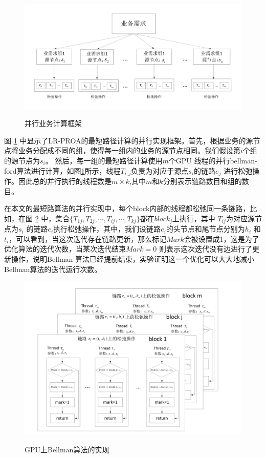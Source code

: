 \begin{figure}
\setlength{\belowcaptionskip}{-0.5cm}
\begin{center}
{\includegraphics[width=1 \textwidth]{figures/paframework.pdf}}
\end{center}
\caption{{\footnotesize{并行业务计算框架}}}
\label{ParFramework}
\end{figure}

图 \ref{ParFramework} 中显示了LR-PROA的最短路径计算的并行实现框架。首先，根据业务的源节点将业务分配成不同的组，使得每一组内的业务的源节点相同。我们假设第$i$个组的源节点为$s_i$。 然后，每一组的最短路径计算使用$m$个GPU 线程的并行bellman-ford算法进行计算，如图\ref{ParFramework}所示，线程$T_{i,j}$负责为对应于源点$s_i$的链路$e_{j}$ 进行松弛操作。因此总的并行执行的线程数是$m \times k$,其中$m$和$k$分别表示链路数目和组的数目。

在本文的最短路算法的并行实现中，每个block内部的线程都松弛同一条链路，比如，在图 \ref{GB} 中，集合$\{T_{1j}, T_{2j}, \cdots, T_{ij}, \cdots, T_{kj}\}$都在$block_j$上执行，其中 $T_{ij}$为对应源节点为$s_i$ 的链路$e_i$执行松弛操作，其中，我们设链路$e_i$的头节点和尾节点分别为$h_i$ 和$t_i$，可以看到，当这次迭代存在链路更新，那么标记$Mark$会被设置成1，这是为了优化算法的迭代次数，当某次迭代结束$Mark=0$ 则表示这次迭代没有边进行了更新操作，说明Bellman 算法已经提前结束，实验证明这一个优化可以大大地减小Bellman算法的迭代运行次数。
\begin{figure}
\setlength{\belowcaptionskip}{-0.5cm}
\begin{center}
{\includegraphics[width=1 \textwidth]{figures/GPUimpl.pdf}}
\end{center}
\caption{{\footnotesize{GPU上Bellman算法的实现}}}
\label{GB}
\end{figure}

